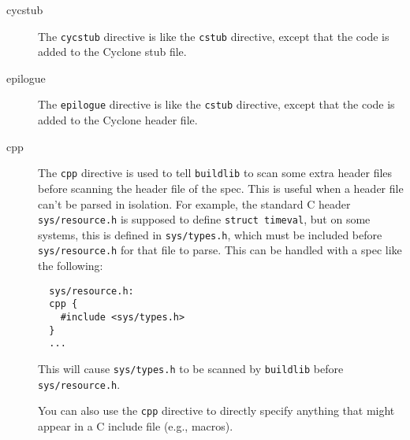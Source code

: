 \begin{description}
\item[cycstub]
The \texttt{cycstub} directive is like the \texttt{cstub} directive,
except that the code is added to the Cyclone stub file.

\item[epilogue]
The \texttt{epilogue} directive is like the \texttt{cstub} directive,
except that the code is added to the Cyclone header file.

\item[cpp]
The \texttt{cpp} directive is used to tell \texttt{buildlib} to scan
some extra header files before scanning the header file of the spec.
This is useful when a header file can't be parsed in isolation.  For
example, the standard C header \texttt{sys/resource.h} is supposed to
define \texttt{struct timeval}, but on some systems, this is defined
in \texttt{sys/types.h}, which must be included before
\texttt{sys/resource.h} for that file to parse.  This can be handled
with a spec like the following:
\begin{verbatim}
  sys/resource.h:
  cpp {
    #include <sys/types.h>
  }
  ...
\end{verbatim}

This will cause \texttt{sys/types.h} to be scanned by
\texttt{buildlib} before \texttt{sys/resource.h}.

You can also use the \texttt{cpp} directive to directly specify
anything that might appear in a C include file (e.g., macros).
\end{description}

